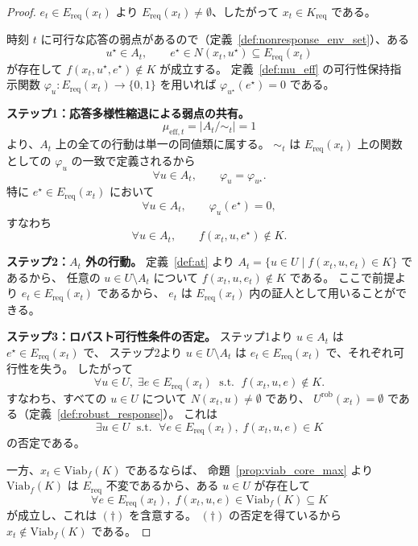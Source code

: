 \begin{proof}
$e_t\in E_{\mathrm{req}}(x_t)$ より
$E_{\mathrm{req}}(x_t)\neq\emptyset$、したがって
$x_t\in K_{\mathrm{req}}$ である。

時刻 $t$ に可行な応答の弱点があるので（定義~\ref{def:nonresponse_env_set}）、ある
\[
  u^\star\in A_t,
  \qquad
  e^\star\in N(x_t,u^\star)\subseteq E_{\mathrm{req}}(x_t)
\]
が存在して $f(x_t,u^\star,e^\star)\notin K$ が成立する。
定義~\ref{def:mu_eff} の可行性保持指示関数
$\varphi_u:E_{\mathrm{req}}(x_t)\to\{0,1\}$ を用いれば
$\varphi_{u^\star}(e^\star)=0$ である。

\textbf{ステップ1：応答多様性縮退による弱点の共有。}
\[
  \mu_{\mathrm{eff},t}
  =
  \bigl|A_t/\!\sim_t\bigr|
  =
  1
\]
より、$A_t$ 上の全ての行動は単一の同値類に属する。
$\sim_t$ は $E_{\mathrm{req}}(x_t)$ 上の関数としての
$\varphi_u$ の一致で定義されるから
\[
  \forall u\in A_t,
  \qquad
  \varphi_u=\varphi_{u^\star}.
\]
特に $e^\star\in E_{\mathrm{req}}(x_t)$ において
\[
  \forall u\in A_t,
  \qquad
  \varphi_u(e^\star)=0,
\]
すなわち
\[
  \forall u\in A_t,
  \qquad
  f(x_t,u,e^\star)\notin K.
\]

\textbf{ステップ2：$A_t$ 外の行動。}
定義~\ref{def:at} より
$A_t=\{u\in U\mid f(x_t,u,e_t)\in K\}$ であるから、
任意の $u\in U\setminus A_t$ について
$f(x_t,u,e_t)\notin K$ である。
ここで前提より $e_t\in E_{\mathrm{req}}(x_t)$ であるから、
$e_t$ は $E_{\mathrm{req}}(x_t)$ 内の証人として用いることができる。

\textbf{ステップ3：ロバスト可行性条件の否定。}
ステップ1より $u\in A_t$ は $e^\star\in E_{\mathrm{req}}(x_t)$ で、
ステップ2より $u\in U\setminus A_t$ は
$e_t\in E_{\mathrm{req}}(x_t)$ で、それぞれ可行性を失う。
したがって
\[
  \forall u\in U,\;
  \exists e\in E_{\mathrm{req}}(x_t)
  \;\text{ s.t. }\;
  f(x_t,u,e)\notin K.
\]
すなわち、すべての $u\in U$ について $N(x_t,u)\neq\emptyset$ であり、
$U^{\mathrm{rob}}(x_t)=\emptyset$ である（定義~\ref{def:robust_response}）。
これは
\[
  \exists u\in U
  \;\text{ s.t. }\;
  \forall e\in E_{\mathrm{req}}(x_t),\;
  f(x_t,u,e)\in K
  \tag{$\dagger$}
\]
の否定である。

一方、$x_t\in\mathrm{Viab}_f(K)$ であるならば、
命題~\ref{prop:viab_core_max} より $\mathrm{Viab}_f(K)$ は
$E_{\mathrm{req}}$ 不変であるから、ある $u\in U$ が存在して
\[
  \forall e\in E_{\mathrm{req}}(x_t),\;
  f(x_t,u,e)\in\mathrm{Viab}_f(K)\subseteq K
\]
が成立し、これは $(\dagger)$ を含意する。
$(\dagger)$ の否定を得ているから
$x_t\notin\mathrm{Viab}_f(K)$ である。
\end{proof}

